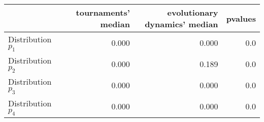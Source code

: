 \begin{tabular}{lrrr}
\toprule
                   &  tournaments' median &  evolutionary dynamics' median &  p\-values \\
\midrule
Distribution $p_1$ &         0.000 &               0.000 &       0.0 \\
Distribution $p_2$ &         0.000 &               0.189 &       0.0 \\
Distribution $p_3$ &         0.000 &               0.000 &       0.0 \\
Distribution $p_4$ &         0.000 &               0.000 &       0.0 \\
\bottomrule
\end{tabular}

